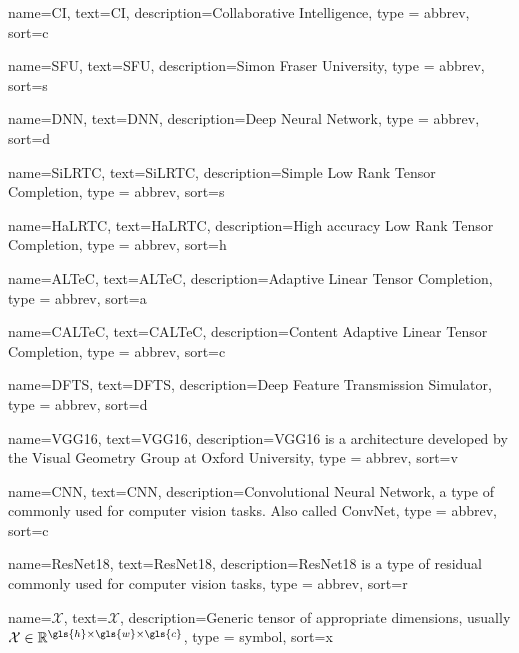 

\makeglossaries

%
{%
	name={CI},
	text={CI},
	description={Collaborative Intelligence},
	type = {abbrev},
	sort={c}
}

%
{%
	name={SFU},
	text={SFU},
	description={Simon Fraser University},
	type = {abbrev},
	sort={s}
}

%
{%
	name={DNN},
	text={DNN},
	description={Deep Neural Network},
	type = {abbrev},
	sort={d}
}

%
{%
	name={SiLRTC},
	text={SiLRTC},
	description={Simple Low Rank Tensor Completion},
	type = {abbrev},
	sort={s}
}

%
{%
	name={HaLRTC},
	text={HaLRTC},
	description={High accuracy Low Rank Tensor Completion},
	type = {abbrev},
	sort={h}
}

%
{%
	name={ALTeC},
	text={ALTeC},
	description={Adaptive Linear Tensor Completion},
	type = {abbrev},
	sort={a}
}

%
{%
	name={CALTeC},
	text={CALTeC},
	description={Content Adaptive Linear Tensor Completion},
	type = {abbrev},
	sort={c}
}


%
{%
	name={DFTS},
	text={DFTS},
	description={Deep Feature Transmission Simulator},
	type = {abbrev},
	sort={d}
}

%
{%
	name={VGG16},
	text={VGG16},
	description={VGG16 is a  architecture developed by the Visual Geometry Group at Oxford University},
	type = {abbrev},
	sort={v}
}

%
{%
	name={CNN},
	text={CNN},
	description={Convolutional Neural Network, a type of  commonly used for computer vision tasks. Also called ConvNet},
	type = {abbrev},
	sort={c}
}


%
{%
	name={ResNet18},
	text={ResNet18},
	description={ResNet18 is a type of residual  commonly used for computer vision tasks},
	type = {abbrev},
	sort={r}
}

%
{%
	name={$\mathcal{X}$},
	text={\ensuremath{\mathcal{X}}},
	description={Generic tensor of appropriate dimensions, usually $\mathcal{X} \in \mathbb{R}^{\gls{h} \times \gls{w} \times \gls{c}}$},
	type = {symbol},
	sort={x}
}

